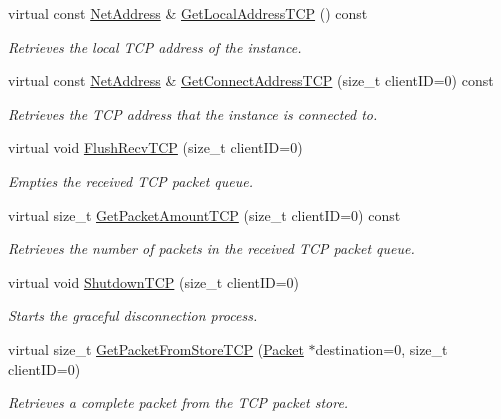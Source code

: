 \begin{DoxyCompactItemize}
virtual const \hyperlink{class_net_address}{NetAddress} \& \hyperlink{class_net_instance_implemented_t_c_p_afa6ba30d5b40f92a555bc870fd3ce118}{GetLocalAddressTCP} () const 
\begin{DoxyCompactList}\small\item\em Retrieves the local TCP address of the instance. \item\end{DoxyCompactList}\item 
virtual const \hyperlink{class_net_address}{NetAddress} \& \hyperlink{class_net_instance_implemented_t_c_p_aa4b2a445f693614d4a6515886cda5148}{GetConnectAddressTCP} (size\_\-t clientID=0) const 
\begin{DoxyCompactList}\small\item\em Retrieves the TCP address that the instance is connected to. \item\end{DoxyCompactList}\item 
virtual void \hyperlink{class_net_instance_implemented_t_c_p_aa8ca0a407982129948841ccf1825533b}{FlushRecvTCP} (size\_\-t clientID=0)
\begin{DoxyCompactList}\small\item\em Empties the received TCP packet queue. \item\end{DoxyCompactList}\item 
virtual size\_\-t \hyperlink{class_net_instance_implemented_t_c_p_a4ac64bdf989a0b15a949b9568465b0f2}{GetPacketAmountTCP} (size\_\-t clientID=0) const 
\begin{DoxyCompactList}\small\item\em Retrieves the number of packets in the received TCP packet queue. \item\end{DoxyCompactList}\item 
virtual void \hyperlink{class_net_instance_implemented_t_c_p_a35cc59e1f2ad733f7f5138e4233688ba}{ShutdownTCP} (size\_\-t clientID=0)
\begin{DoxyCompactList}\small\item\em Starts the graceful disconnection process. \item\end{DoxyCompactList}\item 
virtual size\_\-t \hyperlink{class_net_instance_implemented_t_c_p_a6f2ba030a5543dac75864ba1e35d9398}{GetPacketFromStoreTCP} (\hyperlink{class_packet}{Packet} $\ast$destination=0, size\_\-t clientID=0)
\begin{DoxyCompactList}\small\item\em Retrieves a complete packet from the TCP packet store. \item\end{DoxyCompactList}\item 

\end{DoxyCompactItemize}

